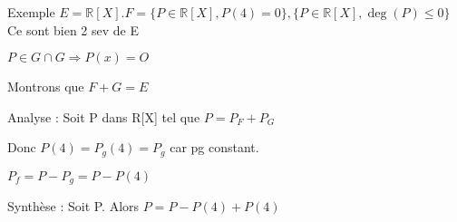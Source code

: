 \documentclass[french]{yLectureNote}
\newcommand{\R}[0]{\mathbb{R}}
\begin{document}
Exemple \(E = \R[X]. F = \{P\in \R[X],P(4)=0\}, \{P\in \R[X],\deg(P)\leq0\}\) Ce sont bien 2 sev de E

\(P\in G\cap G \Rightarrow P(x) = O\)

Montrons que \(F+G = E\)

Analyse : Soit P dans R[X] tel que \(P = P_F+P_G\)

Donc \(P(4) = P_g(4) = P_g\) car pg constant.

\(P_f = P-P_g = P-P(4)\)

Synthèse : Soit P. Alors \(P = P-P(4) + P(4)\)
\end{document}
